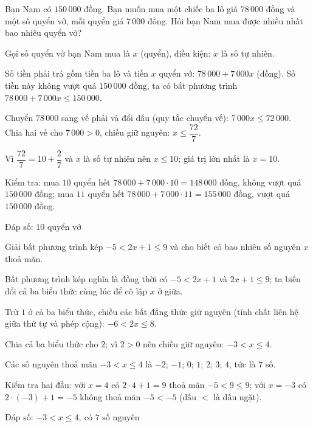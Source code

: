 \begin{problem}[9DS-BPT-037]
Bạn Nam có $150\,000$ đồng. Bạn muốn mua một chiếc ba lô giá $78\,000$ đồng và một số quyển vở, mỗi quyển giá $7\,000$ đồng. Hỏi bạn Nam mua được nhiều nhất bao nhiêu quyển vở?

\begin{solution}
Gọi số quyển vở bạn Nam mua là $x$ (quyển), điều kiện: $x$ là số tự nhiên.

Số tiền phải trả gồm tiền ba lô và tiền $x$ quyển vở: $78\,000 + 7\,000x$ (đồng). Số tiền này không vượt quá $150\,000$ đồng, ta có bất phương trình $78\,000 + 7\,000x \leq 150\,000$.

Chuyển $78\,000$ sang vế phải và đổi dấu (quy tắc chuyển vế): $7\,000x \leq 72\,000$. Chia hai vế cho $7\,000 > 0$, chiều giữ nguyên: $x \leq \dfrac{72}{7}$.

Vì $\dfrac{72}{7} = 10 + \dfrac{2}{7}$ và $x$ là số tự nhiên nên $x \leq 10$; giá trị lớn nhất là $x = 10$.

Kiểm tra: mua $10$ quyển hết $78\,000 + 7\,000 \cdot 10 = 148\,000$ đồng, không vượt quá $150\,000$ đồng; mua $11$ quyển hết $78\,000 + 7\,000 \cdot 11 = 155\,000$ đồng, vượt quá $150\,000$ đồng.

Đáp số: $\boxed{10 \text{ quyển vở}}$
\end{solution}
\end{problem}

\begin{problem}[9DS-BPT-038]
Giải bất phương trình kép $-5 < 2x + 1 \leq 9$ và cho biết có bao nhiêu số nguyên $x$ thoả mãn.

\begin{solution}
Bất phương trình kép nghĩa là đồng thời có $-5 < 2x + 1$ và $2x + 1 \leq 9$; ta biến đổi cả ba biểu thức cùng lúc để cô lập $x$ ở giữa.

Trừ $1$ ở cả ba biểu thức, chiều các bất đẳng thức giữ nguyên (tính chất liên hệ giữa thứ tự và phép cộng): $-6 < 2x \leq 8$.

Chia cả ba biểu thức cho $2$; vì $2 > 0$ nên chiều giữ nguyên: $-3 < x \leq 4$.

Các số nguyên thoả mãn $-3 < x \leq 4$ là $-2$; $-1$; $0$; $1$; $2$; $3$; $4$, tức là $7$ số.

Kiểm tra hai đầu: với $x = 4$ có $2 \cdot 4 + 1 = 9$ thoả mãn $-5 < 9 \leq 9$; với $x = -3$ có $2 \cdot (-3) + 1 = -5$ không thoả mãn $-5 < -5$ (dấu $<$ là dấu ngặt).

Đáp số: $\boxed{-3 < x \leq 4,\ \text{có } 7 \text{ số nguyên}}$
\end{solution}
\end{problem}

